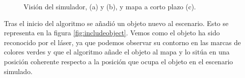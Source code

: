 \begin{figure}[hbtp]
  \begin{center}
  \end{center}
  \caption{Visión del simulador, (a) y (b), y mapa a corto plazo (c).}
  \label{fig:initserver}
\end{figure}

Tras el inicio del algoritmo se añadió un objeto nuevo al escenario. Esto se representa en la figura \ref{fig:includeobject}. Vemos como el objeto ha sido reconocido por el láser, ya que podemos observar su contorno en las marcas de colores verdes y que el algoritmo añade el objeto al mapa y lo sitúa en una posición coherente respecto a la posición que ocupa el objeto en el escenario simulado.


